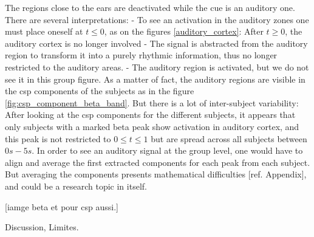 The regions close to the ears are deactivated while the cue is an auditory one. There are several interpretations:
- To see an activation in the auditory zones one must place oneself at $t \leq 0$, as on the figures \ref{auditory_cortex}: After $t \geq 0$, the auditory cortex is no longer involved
- The signal is abstracted from the auditory region to transform it into a purely rhythmic information, thus no longer restricted to the auditory areas.
- The auditory region is activated, but we do not see it in this group figure. As a matter of fact, the auditory regions are visible in the csp components of the subjects as in the figure \ref{fig:csp_component_beta_band}. But there is a lot of inter-subject variability: After looking at the csp components for the different subjects, it appears that only subjects with a marked beta peak show activation in auditory cortex, and this peak is not restricted to $0 \leq t \leq 1$ but are spread across all subjects between $0s - 5s$. In order to see an auditory signal at the group level, one would have to align and average the first extracted components for each peak from each subject. But averaging the components presents mathematical difficulties [ref. Appendix], and could be a research topic in itself.

[iamge beta et pour csp aussi.]

Discussion, Limites.
